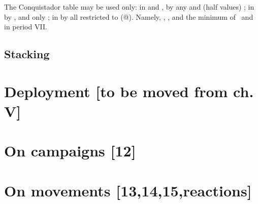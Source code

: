 The Conquistador table may be used only:
\bparag in  and , by any \LeaderC and
\LeaderE (half values) ;
\bparag in  by ,  and
 only ;
\bparag in  by all \LeaderC restricted to 
(@). Namely, , ,  and the minimum
\LeaderC@ of \FRA and \ANG in period VII.

\subsection{Stacking}\label{chMilitary:Stacking}


\section{Deployment [to be moved from ch. V]}


\section{On campaigns [12]}

\section{On movements [13,14,15,reactions]}
